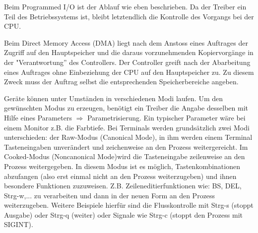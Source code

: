 \begin{answer}
  Beim Programmed I/O ist der Ablauf wie eben beschrieben. Da der Treiber ein Teil des Betriebssystems ist, bleibt letztendlich die Kontrolle des Vorgangs bei der CPU. 
  
  Beim Direct Memory Access (DMA) liegt nach dem Anstoss eines Auftrages der Zugriff auf den
  Hauptspeicher und die daraus vorzunehmenden Kopiervorgänge in der "Verantwortung'' des Controllers.
  Der Controller greift nach der Abarbeitung eines Auftrages ohne Einbeziehung der CPU
  auf den Hauptspeicher zu. Zu diesem Zweck muss der Auftrag selbst die entsprechenden Speicherbereiche
  angeben.
\end{answer}

\begin{answer}
  Geräte können unter Umständen in verschiedenen Modi laufen. Um den gewünschten Modus zu
  erzeugen, benötigt ein Treiber die Angabe desselben mit Hilfe eines Parameters $\Rightarrow$ Parametrisierung.
  Ein typischer Parameter wäre bei einem Monitor z.B. die Farbtiefe.
  Bei Terminals werden grundsätzlich zwei Modi unterschieden: der Raw-Modus (Canonical Mode),
  in ihm werden einem Terminal Tasteneingaben unverändert und zeichenweise an den Prozess
  weitergereicht. Im Cooked-Modus (Noncanonical Mode)wird die Tasteneingabe zeilenweise an den
  Prozess weitergegeben. In diesem Modus ist es möglich, Tastenkombinationen abzufangen (also
  erst einmal nicht an den Prozess weiterzugeben) und ihnen besondere Funktionen zuzuweisen.
  Z.B. Zeileneditierfunktionen wie: BS, DEL, Strg-w,... zu verarbeiten und dann in der neuen Form
  an den Prozess weiterzugeben. Weitere Beispiele hierfür sind die Flusskontrolle mit Strg-s (stoppt
  Ausgabe) oder Strg-q (weiter) oder Signale wie Strg-c (stoppt den Prozess mit SIGINT).
\end{answer}

